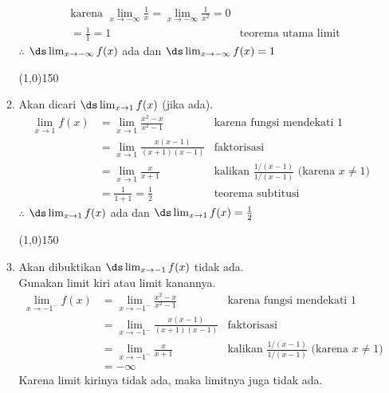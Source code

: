 \begin{enumerate}[leftmargin=*, label={\arabic*}.]
\begin{enumerate}[label={\alph*}.]
\begin{align*}
        &\text{karena $\lim_{x\to -\infty}\frac{1}{x} = \lim_{x\to -\infty}\frac{1}{x^{2}} = 0$}\\
        &= \frac{1}{1} = 1
        &\text{teorema utama limit}
    \end{align*} 
    $\therefore$ $\ds \lim_{x \to -\infty} f(x)$ ada dan 
    $\ds \lim_{x \to -\infty} f(x) = 1$
\begin{center}
\line(1,0){150}
\end{center}
    \item Akan dicari $\ds \lim_{x \to 1} f(x)$ (jika ada).
    \begin{align*}
        \lim_{x \to 1} f(x) 
        &= \lim_{x \to 1} \frac{x^{2}-x}{x^{2}-1}
        &\text{karena fungsi mendekati $1$}\\
        &= \lim_{x \to 1} \frac{x(x-1)}{(x+1)(x-1)}
        &\text{faktorisasi}\\
        &=\lim_{x \to 1} \frac{x}{x+1}
        &\text{kalikan $\frac{1/(x-1)}{1/(x-1)}$ (karena $x \neq 1$)}\\
        &= \frac{1}{1+1} = \frac{1}{2} 
        &\text{teorema subtitusi}
    \end{align*} 
    $\therefore$ $\ds \lim_{x \to 1} f(x)$ ada dan 
    $\ds \lim_{x \to 1} f(x) = \frac{1}{2}$
\begin{center}
\line(1,0){150}
\end{center}    
    \item Akan dibuktikan $\ds \lim_{x \to -1} f(x)$ tidak ada.\\
    Gunakan limit kiri atau limit kanannya.
    \begin{align*}
        \lim_{x \to -1^{-}} f(x) 
        &= \lim_{x \to -1^{-}} \frac{x^{2}-x}{x^{2}-1}
        &\text{karena fungsi mendekati $1$}\\
        &= \lim_{x \to -1^{-}} \frac{x(x-1)}{(x+1)(x-1)}
        &\text{faktorisasi}\\
        &= \lim_{x \to -1^{-}} \frac{x}{x+1}
        &\text{kalikan $\frac{1/(x-1)}{1/(x-1)}$ (karena $x \neq 1$)}\\
        &= -\infty
    \end{align*} 
    Karena limit kirinya tidak ada, maka limitnya juga tidak ada.


\end{enumerate}
\end{enumerate}
